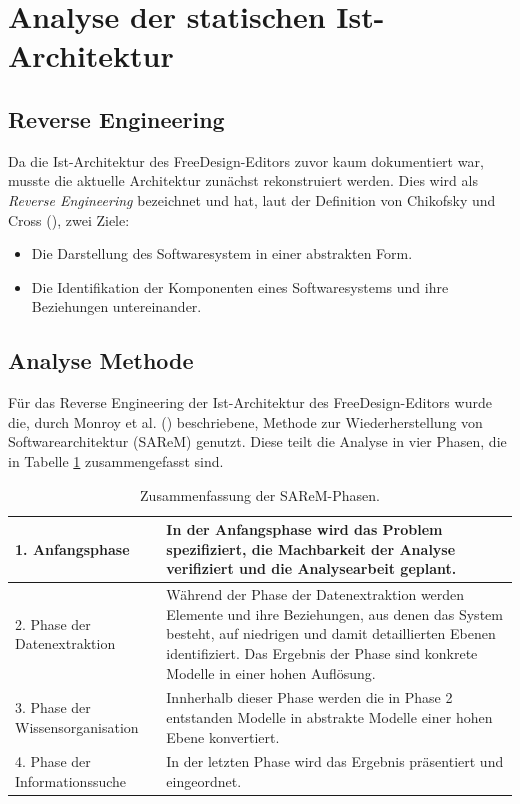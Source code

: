 

\section{Analyse der statischen Ist-Architektur}

\subsection{Reverse Engineering}
Da die Ist-Architektur des FreeDesign-Editors zuvor kaum dokumentiert war, musste die aktuelle Architektur zunächst rekonstruiert werden. 
Dies wird als \emph{Reverse Engineering} bezeichnet und hat, laut der Definition von Chikofsky und Cross (\citeyear[S. 13-17]{Chikofsky1990}), zwei Ziele: 
\begin{itemize}
    \item Die Darstellung des Softwaresystem in einer abstrakten Form. 
    \item Die Identifikation der Komponenten eines Softwaresystems und ihre Beziehungen untereinander. 
\end{itemize}


\subsection{Analyse Methode}
Für das Reverse Engineering der Ist-Architektur des FreeDesign-Editors wurde die, durch Monroy et al. (\citeyear[vgl.][]{Monroy2018}) beschriebene, Methode zur Wiederherstellung von Softwarearchitektur (SAReM) genutzt. Diese teilt die Analyse in vier Phasen, die in Tabelle \ref{table:SAReM} zusammengefasst sind.
\begin{table}[H]
    \centering
    \caption{Zusammenfassung der SAReM-Phasen.}
    \label{table:SAReM}
    \begin{tabularx}{\columnwidth}{l|X}
        1. Anfangsphase & In der Anfangsphase wird das Problem spezifiziert, die Machbarkeit der Analyse verifiziert und die Analysearbeit geplant. \\
        \hline
        
        2. Phase der Datenextraktion & Während der Phase der Datenextraktion werden Elemente und ihre Beziehungen, aus denen das System besteht, auf niedrigen und damit detaillierten Ebenen identifiziert. Das Ergebnis der Phase sind konkrete Modelle in einer hohen Auflösung. \\
        \hline

        3. Phase der Wissensorganisation &  Innherhalb dieser Phase werden die in Phase 2 entstanden 
        Modelle in abstrakte Modelle einer hohen Ebene konvertiert.\\
        \hline

        4. Phase der Informationssuche & In der letzten Phase wird das Ergebnis präsentiert und eingeordnet. \\

    \end{tabularx}
\end{table}  

